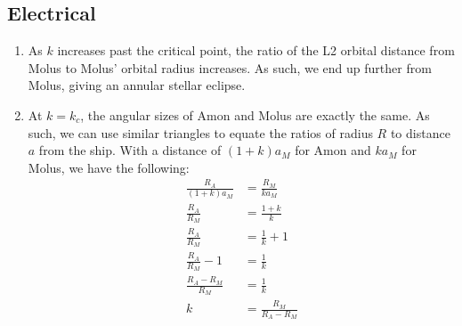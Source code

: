 \documentclass{article}
\begin{document}
\subsection{Electrical}
\begin{enumerate}
\item As $k$ increases past the critical point, the ratio of the L2 orbital distance from Molus to Molus' orbital radius increases. As such, we end up further from Molus, giving an annular stellar eclipse.
\item At $k=k_c$, the angular sizes of Amon and Molus are exactly the same. As such, we can use similar triangles to equate the ratios of radius $R$ to distance $a$ from the ship. With a distance of $(1+k)a_M$ for Amon and $ka_M$ for Molus, we have the following:
\begin{equation}
\begin{split}
\frac{R_A}{(1+k)a_M}&=\frac{R_M}{ka_M}\\
\frac{R_A}{R_M}&=\frac{1+k}{k}\\
\frac{R_A}{R_M}&=\frac{1}{k}+1\\
\frac{R_A}{R_M}-1&=\frac{1}{k}\\
\frac{R_A-R_M}{R_M}&=\frac{1}{k}\\
k&=\frac{R_M}{R_A-R_M}
\end{split}
\end{equation}
\end{enumerate}
\end{document}
